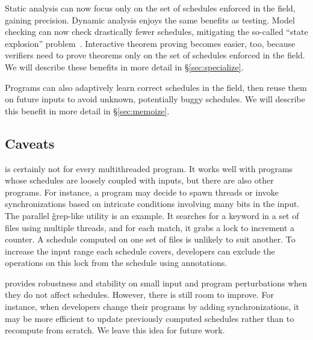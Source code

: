  Static analysis can now focus
only on the set of schedules enforced in the field, gaining
precision.  Dynamic analysis enjoys the same benefits as testing.  Model
checking can now check drastically fewer schedules, mitigating the so-called
``state explosion'' problem~\cite{clarke:ModelChecking}.  Interactive theorem
proving becomes easier, too, because verifiers need to prove theorems only on
the set of schedules enforced in the field.  We will describe these benefits in
more detail in \S\ref{sec:specialize}.

  Programs can also adaptively learn correct
schedules in the field, then reuse them on future inputs to avoid unknown,
potentially buggy schedules.  We will describe this benefit in more
detail in \S\ref{sec:memoize}.

\subsection{Caveats}

\smt is certainly not for every multithreaded program.  It works well with
programs whose schedules are loosely coupled with inputs, but there are also
other programs.  For instance, a program may decide to spawn
threads or invoke synchronizations based on intricate conditions involving many
bits in the input. The parallel \v{grep}-like utility \pfscan is an example.  It
searches for a keyword in a set of files using multiple threads, and for each
match, it grabs a lock to increment a counter.  A schedule computed on one set
of files is unlikely to suit another. To increase the input range each schedule
covers, developers can exclude the operations on this lock from the schedule
using annotations.


\smt provides robustness and stability on small input and program
perturbations when they do not affect schedules.  However, there
is still room to improve.  For instance, when developers change their
programs by adding synchronizations, it may be more efficient to
update previously computed schedules rather than to recompute from
scratch. We leave this idea for future work.
